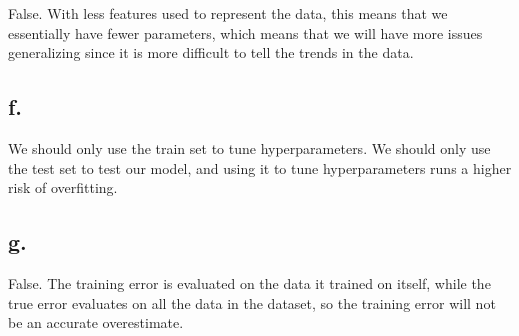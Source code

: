 \documentclass{article}
\newcommand{\1}{\mathbf{1}}
\begin{document}
{False. With less features used to represent the data, this means that we essentially have fewer parameters, which means that we will have more issues generalizing since it is more difficult to tell the trends in the data.

\subsection*{f.}

We should only use the train set to tune hyperparameters. We should only use the test set to test our model, and using it to tune hyperparameters runs a higher risk of overfitting.

\subsection*{g.}

False. The training error is evaluated on the data it trained on itself, while the true error evaluates on all the data in the dataset, so the training error will not be an accurate overestimate.

}
\end{document}
